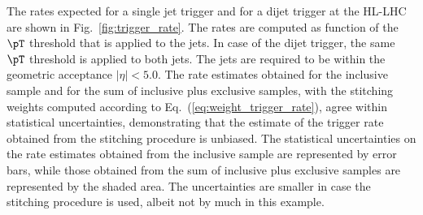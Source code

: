 The rates expected for a single jet trigger and for a dijet trigger at the HL-LHC are shown in Fig.~\ref{fig:trigger_rate}.
The rates are computed as function of the $\pT$ threshold that is applied to the jets. 
In case of the dijet trigger, the same $\pT$ threshold is applied to both jets.
The jets are required to be within the geometric acceptance $\vert\eta\vert < 5.0$.
The rate estimates obtained for the inclusive sample and for the sum of inclusive plus exclusive samples, 
with the stitching weights computed according to Eq.~(\ref{eq:weight_trigger_rate}),
agree within statistical uncertainties, demonstrating that the estimate of the trigger rate obtained from the stitching procedure is unbiased.
The statistical uncertainties on the rate estimates obtained from the inclusive sample are represented by error bars,
while those obtained from the sum of inclusive plus exclusive samples are represented by the shaded area.
The uncertainties are smaller in case the stitching procedure is used, albeit not by much in this example.

